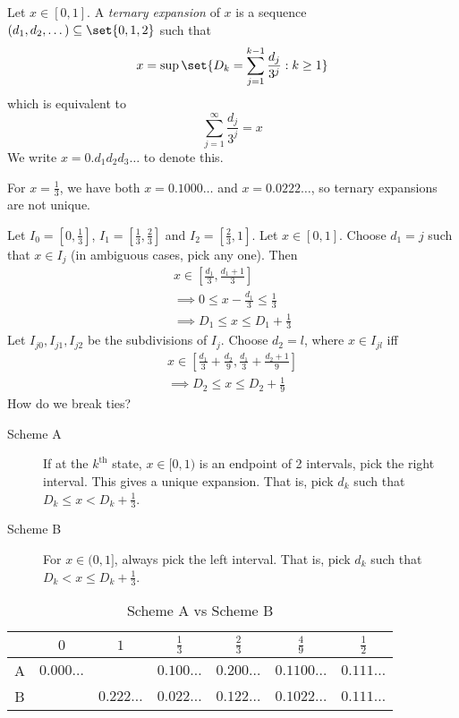 \begin{definition} \label{def:ternary_expansion}
    Let $x \in [0, 1]$.
    A \emph{ternary expansion} of $x$ is a sequence $(d_1, d_2, \dots)
    \subseteq \set{0, 1, 2}$ such that \[
        x = \sup \set{D_k = \sum_{j=1}^{k-1} \frac{d_j}{3^j} : k \ge 1}
    \] which is equivalent to \[
        \sum_{j=1}^{\infty} \frac{d_j}{3^j} = x
    \] We write $x = 0.d_1d_2d_3\dots$ to denote this.
\end{definition}
\begin{example}
    For $x = \frac13$, we have both $x = 0.1000\dots$ and
    $x = 0.0222\dots$, so ternary expansions are not unique.
\end{example}

Let $I_0 = [0, \frac13]$, $I_1 = [\frac13, \frac23]$ and
$I_2 = [\frac23, 1]$.
Let $x \in [0, 1]$.
Choose $d_1 = j$ such that $x \in I_j$ (in ambiguous cases,
pick any one).
Then \begin{align*}
    x \in \left[\frac{d_1}{3}, \frac{d_1 + 1}{3}\right] \\
    \implies 0 \le x - \frac{d_1}{3} \le \frac13 \\
    \implies D_1 \le x \le D_1 + \frac13
\end{align*}
Let $I_{j 0}, I_{j 1}, I_{j 2}$ be the subdivisions of $I_j$.
Choose $d_2 = l$, where $x \in I_{jl}$ iff \begin{align*}
    x \in \left[\frac{d_1}{3} + \frac{d_2}{9},
        \frac{d_1}{3} + \frac{d_2 + 1}{9}\right] \\
    \implies D_2 \le x \le D_2 + \frac19
\end{align*}
How do we break ties?
\begin{description}
    \item[Scheme A] If at the $k^{\text{th}}$ state, $x \in [0, 1)$ is
    an endpoint of 2 intervals, pick the right interval.
    This gives a unique expansion.
    That is, pick $d_k$ such that $D_k \le x < D_k + \frac13$.
    \item[Scheme B] For $x \in (0, 1]$, always pick the left interval.
    That is, pick $d_k$ such that $D_k < x \le D_k + \frac13$.
\end{description}
\begin{table}
    \centering
    \begin{tabular}{c|c|c|c|c|c|c}
        \toprule
        & $0$ & $1$ & $\frac13$ & $\frac23$ & $\frac49$ & $\frac12$ \\
        \midrule
        A & $0.000\dots$ & & $0.100\dots$ & $0.200\dots$ &
            $0.1100\dots$ & $0.111\dots$ \\
        B & & $0.222\dots$ & $0.022\dots$ & $0.122\dots$ &
            $0.1022\dots$ & $0.111\dots$ \\
        \bottomrule
    \end{tabular}
    \caption{Scheme A vs Scheme B}
    \label{tab:ternary_expansion}
\end{table}
